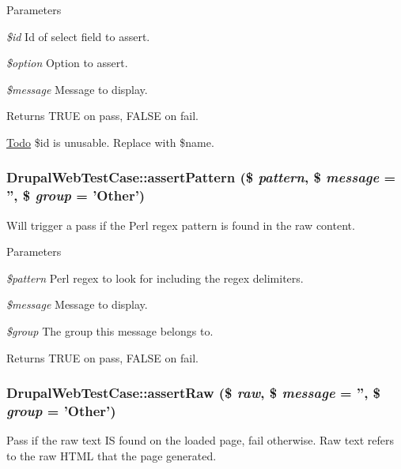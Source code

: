 \begin{DoxyParams}{Parameters}
\item[{\em \$id}]Id of select field to assert. \item[{\em \$option}]Option to assert. \item[{\em \$message}]Message to display. \end{DoxyParams}
\begin{DoxyReturn}{Returns}
TRUE on pass, FALSE on fail.
\end{DoxyReturn}
\begin{Desc}
\item[\hyperlink{todo__todo000020}{Todo}]\$id is unusable. Replace with \$name. \end{Desc}
\hypertarget{classDrupalWebTestCase_a5838fb78298156ab4de6a2ff5cdc4f8b}{
\subsubsection[{assertPattern}]{\setlength{\rightskip}{0pt plus 5cm}DrupalWebTestCase::assertPattern (\$ {\em pattern}, \/  \$ {\em message} = {\ttfamily ''}, \/  \$ {\em group} = {\ttfamily 'Other'})}}
\label{classDrupalWebTestCase_a5838fb78298156ab4de6a2ff5cdc4f8b}
Will trigger a pass if the Perl regex pattern is found in the raw content.


\begin{DoxyParams}{Parameters}
\item[{\em \$pattern}]Perl regex to look for including the regex delimiters. \item[{\em \$message}]Message to display. \item[{\em \$group}]The group this message belongs to. \end{DoxyParams}
\begin{DoxyReturn}{Returns}
TRUE on pass, FALSE on fail. 
\end{DoxyReturn}
\hypertarget{classDrupalWebTestCase_ae15c8d3302ff90dc47d2fd7686ee4005}{
\subsubsection[{assertRaw}]{\setlength{\rightskip}{0pt plus 5cm}DrupalWebTestCase::assertRaw (\$ {\em raw}, \/  \$ {\em message} = {\ttfamily ''}, \/  \$ {\em group} = {\ttfamily 'Other'})}}
\label{classDrupalWebTestCase_ae15c8d3302ff90dc47d2fd7686ee4005}
Pass if the raw text IS found on the loaded page, fail otherwise. Raw text refers to the raw HTML that the page generated.


